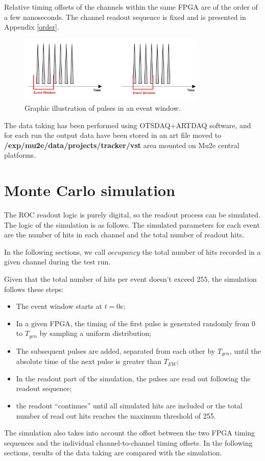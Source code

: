 Relative timing offsets of the channels within the same FPGA are of the order of a few nanoseconds.
The channel readout sequence is fixed and is presented in Appendix \ref{order}.

\begin{figure}[!h]
\centering
\includegraphics[width =0.8\textwidth]{figures/pdf/finalimg}
\caption{Graphic illustration of pulses in an event window.}
\label{fig:3}
\end{figure}

The data taking has been performed using OTSDAQ+ARTDAQ software, and for each run the output data
have been stored in an art file moved to {\bf /exp/mu2e/data/projects/tracker/vst} area mounted
on Mu2e central platforms.


\section{Monte Carlo simulation}\label{MonteCarlo}
 
The ROC readout logic is purely digital, so the readout process can be simulated. 
The logic of the simulation is as follows.
The simulated parameters for each event are the number of hits in each channel
and the total number of readout hits.

In the following sections, we call $occupancy$ the total number of hits
recorded in a given channel during the test run.

Given that the total number of hits per event doesn't exceed 255, the simulation follows these steps:
\begin{itemize}
\item
  The event window starts at $t=0$s;
\item
  In a given FPGA, the timing of the first pulse is generated randomly from 0 to $T_{gen}$
  by sampling a uniform distribution;
\item
  The subsequent pulses are added, separated from each other by $T_{gen}$,
  until the absolute time
  of the next pulse is greater than $T_{EW}$;
\item
  In the readout part of the simulation, the pulses are read out following the readout sequence;
\item
  the readout ``continues'' until all simulated hits are included or
  the total number of read out hits reaches the maximum threshold of 255. 
\end{itemize}

The simulation also takes into account the offset between the two FPGA timing sequences
and the individual channel-to-channel timing offsets. 
In the following sections, results of the data taking are compared with the simulation.

